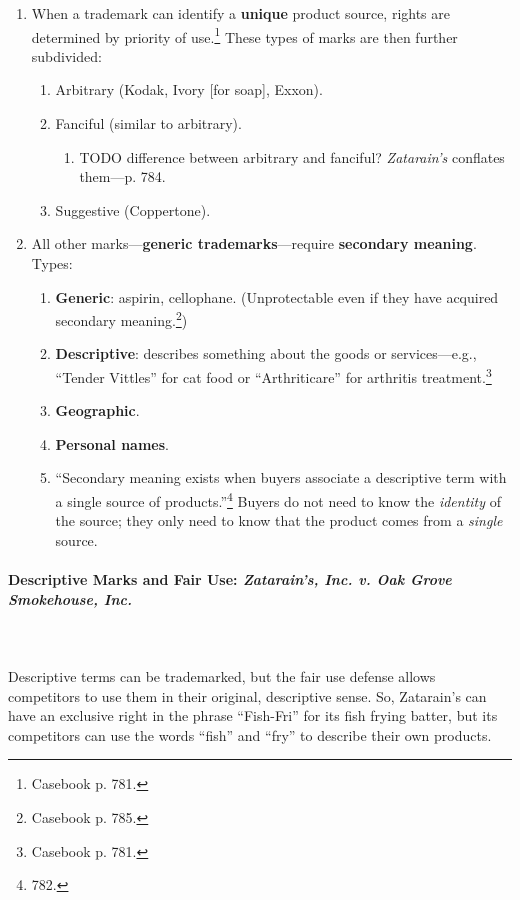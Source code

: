 \begin{enumerate}
    \item When a trademark can identify a \textbf{unique} product source, 
    rights are determined by priority of use.\footnote{Casebook p. 781.} These 
    types of marks are then further subdivided:
    \begin{enumerate}
        \item Arbitrary (Kodak, Ivory [for soap], Exxon).
        \item Fanciful (similar to arbitrary).
        \begin{enumerate}
            \item TODO difference between arbitrary and fanciful? 
            \emph{Zatarain's} conflates them---p. 784.
        \end{enumerate}
    \item Suggestive (Coppertone).
    \end{enumerate}
    \item All other marks---\textbf{generic trademarks}---require 
    \textbf{secondary meaning}. Types:
    \begin{enumerate}
        \item \textbf{Generic}: aspirin, cellophane. (Unprotectable even if 
        they have acquired secondary meaning.\footnote{Casebook p. 785.})
        \item \textbf{Descriptive}: describes something about the 
        goods or services---e.g., ``Tender Vittles'' for cat food or 
        ``Arthriticare'' for arthritis treatment.\footnote{Casebook p. 781.}
        \item \textbf{Geographic}.
        \item \textbf{Personal names}.
        \item ``Secondary meaning exists when buyers associate a descriptive 
        term with a single source of products.''\footnote{782.} Buyers do not 
        need to know the \emph{identity} of the source; they only need to know 
        that the product comes from a \emph{single} source.
    \end{enumerate}
\end{enumerate}

\paragraph{Descriptive Marks and Fair Use: \emph{Zatarain's, Inc. v. Oak Grove 
Smokehouse, Inc.}}
~\\\\
Descriptive terms can be trademarked, but the fair use defense allows 
competitors to use them in their original, descriptive sense. So, Zatarain's 
can have an exclusive right in the phrase ``Fish-Fri'' for its fish frying 
batter, but its competitors can use the words ``fish'' and ``fry'' to describe 
their own products.

